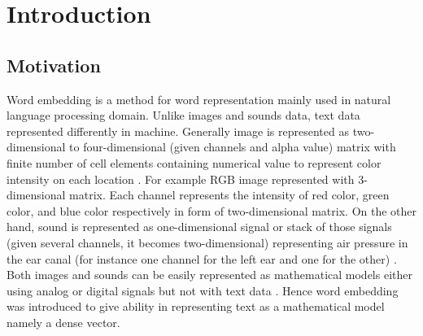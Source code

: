 \chapter{Introduction}
\label{chap:intro}

\section{Motivation} 
    Word embedding is a method for word representation mainly used in
    natural language processing domain. Unlike images and sounds data,
    text data represented differently in machine. Generally image is
    represented as two-dimensional to four-dimensional (given channels
    and alpha value) matrix with finite number of cell elements
    containing numerical value to represent color intensity on each
    location \citep{imageprocessing2018tyagi}. For example RGB image
    represented with 3-dimensional matrix. Each channel represents the
    intensity of red color, green color, and blue color respectively
    in form of two-dimensional matrix. On the other hand, sound is
    represented as one-dimensional signal or stack of those signals
    (given several channels, it becomes two-dimensional) representing
    air pressure in the ear canal (for instance one channel for the
    left ear and one for the other) \citep{sound1995rocchesso}. Both
    images and sounds can be easily represented as mathematical models
    either using analog or digital signals but not with text data
    \citep{wordembedding2017yang}. Hence word embedding was introduced
    to give ability in representing text as a mathematical model
    namely a dense vector.
    
